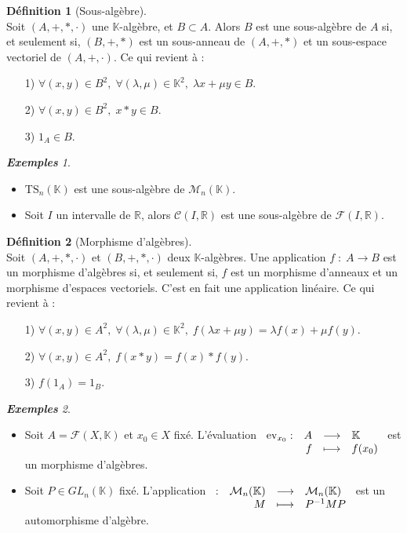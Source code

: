 \documentclass[12pt]{book}
\let\ensembleNombre\mathbb
\newcommand*\R{\ensuremath{\ensembleNombre{R}}}
\newcommand*\K{\ensuremath{\ensembleNombre{K}}}
\newcommand{\app}[5]{\ensuremath{
\begin{array}[t]{lrcl}
#1 : & #2 & \longrightarrow & #3 \\
    & #4 & \longmapsto & #5 \end{array}
}}
\theoremstyle{definition}
\newtheorem*{defi}{Définition}
\theoremstyle{remark}
\newtheorem*{exs}{\textbf{Exemples}}
\newenvironment{fdef}
  {\begin{mdframed}[roundcorner=10pt, linewidth=1pt]\begin{defi}}
  {\end{defi}\end{mdframed}}
\begin{document}
	\begin{fdef}[Sous-algèbre] \mbox{~}\\
	Soit $(A, +, *, \cdot)$ une $\K$-algèbre, et $B\subset A$. Alors $B$ est une sous-algèbre de $A$ si, et seulement si, $(B, +, *)$ est un sous-anneau de $(A, +, *)$ et un sous-espace vectoriel de $(A, +, \cdot)$. Ce qui revient à :
	\begin{itemize}
	\item[1)] $\forall (x,y) \in B^2,\; \forall (\lambda, \mu) \in \K^2, \; \lambda x + \mu y \in B.$
	\item[2)] $\forall (x,y) \in B^2,\; x * y \in B.$
	\item[3)] $1_A \in B$.
	\end{itemize}
	\end{fdef}
	
	\begin{exs} \mbox{~}\\
	\begin{itemize}
	\item $\mathrm{TS}_n(\K)$ est une sous-algèbre de $\mathcal M_n(\K)$.
	\item Soit $I$ un intervalle de $\R$, alors $\mathcal C(I, \R)$ est une sous-algèbre de $\mathcal F(I, \R)$.
	\end{itemize}
	\end{exs}
	
	\begin{fdef}[Morphisme d'algèbres] \mbox{~}\\
	Soit $(A, +, *, \cdot)$ et $(B, +, *, \cdot)$ deux $\K$-algèbres. Une application $f \; : \; A \to B$ est un morphisme d'algèbres si, et seulement si, $f$ est un morphisme d'anneaux et un morphisme d'espaces vectoriels. C'est en fait une application linéaire. Ce qui revient à :
	\begin{itemize}
	\item[1)] $\forall (x,y) \in A^2,\; \forall (\lambda, \mu) \in \K^2, \; f(\lambda x + \mu y) = \lambda f(x) + \mu f(y).$
	\item[2)] $\forall (x,y) \in A^2,\; f(x * y) = f(x) * f(y).$
	\item[3)] $f(1_A) = 1_B.$
	\end{itemize}
	\end{fdef}
	
	\begin{exs}\mbox{~}\\
	\begin{itemize}
	\item Soit $A = \mathcal F(X, \K)$ et $x_0 \in X$ fixé. L'évaluation $\app{\mathrm{ev}_{x_0}}{A}{\K}{f}{f(x_0)}$ est un morphisme d'algèbres.
	\item Soit $P \in GL_n(\K)$ fixé. L'application $\app{}{\mathcal M_n(\K)}{\mathcal M_n(\K)}{M}{P^{-1}MP}$ est un automorphisme d'algèbre.
	\end{itemize}
	\end{exs}
	
\end{document}
